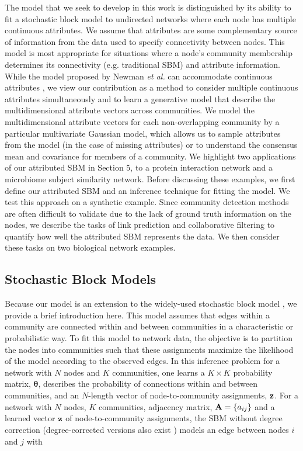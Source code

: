 The model that we seek to develop in this work is distinguished by its ability to fit a stochastic block model to undirected networks where each node has multiple continuous attributes. We assume that attributes are some complementary source of information from the data used to specify connectivity between nodes. This model is most appropriate for situations where a node's community membership determines its connectivity (e.g. traditional SBM) and attribute information. While the model proposed by Newman \emph{et al.} can accommodate continuous attributes \cite{clauset}, we view our contribution as a method to consider multiple continuous attributes simultaneously and to learn a generative model that describe the multidimensional attribute vectors across communities. We model the multidimensional attribute vectors for each non-overlapping community by a particular multivariate Gaussian model, which allows us to  sample attributes from the model (in the case of missing attributes) or to understand the consensus mean and covariance for members of a community.  We highlight two applications of our attributed SBM in Section 5, to a protein interaction network and a microbiome subject similarity network. Before discussing these examples, we first define our attributed SBM and an inference technique for fitting the model. We test this approach on a synthetic example. Since community detection methods are often difficult to validate due to the lack of ground truth information on the nodes, we describe the tasks of link prediction and collaborative filtering to quantify how well the attributed SBM represents the data. We then consider these tasks on two biological network examples.

\subsection{Stochastic Block Models}
Because our model is an extension to the widely-used stochastic block model \cite{sbmOrig}, we provide a brief introduction here. This model assumes that edges within a community are connected within and between communities in a characteristic or probabilistic way. To fit this model to network data, the objective is to partition the nodes into communities such that these assignments maximize the likelihood of the model according to the observed edges. In this inference problem for a network with $N$ nodes and $K$ communities, one learns a $K \times K$ probability matrix, ${\boldsymbol \theta}$, describes the probability of connections within and between communities, and an $N$-length vector of node-to-community assignments, ${\bf z}$. For a network with $N$ nodes, $K$ communities, adjacency matrix, ${\bf A}=\{a_{ij}\}$ and a learned vector ${\bf z}$ of node-to-community assignments, the SBM without degree correction (degree-corrected versions also exist \cite{degreeCorrect}) models an edge between nodes $i$ and $j$ with

